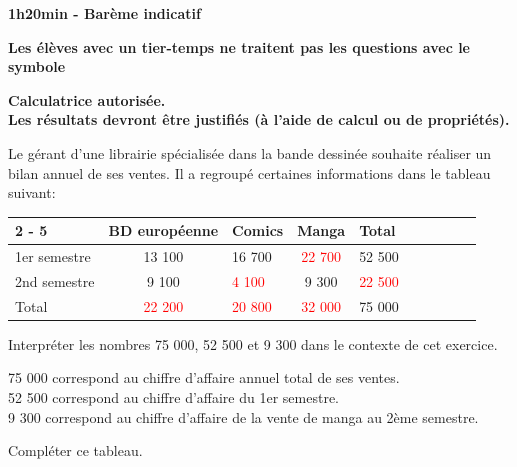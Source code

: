 \documentclass[11pt,a4paper]{article}  %
\begin{document}
	\graphicspath{{images/}}
	
	\begin{center}
		
		
	\end{center}

\begin{center}\textbf{1h20min - Barème indicatif}\end{center}
\begin{center}\textbf{Les élèves avec un tier-temps ne traitent pas les questions avec  le symbole }\end{center}
\begin{center}\textbf{Calculatrice autorisée.\\Les résultats devront être justifiés (à l'aide de calcul ou de propriétés).}\end{center}


Le gérant d'une librairie spécialisée dans la bande dessinée souhaite réaliser un bilan annuel de ses ventes. Il a regroupé certaines informations dans le tableau suivant:\\
\begin{tabular}{|Xc|Xc|Xc|Xc|Xc|}
	\cline { 2 - 5 } \multicolumn{1}{c|}{} & BD européenne & Comics & Manga & Total \\
	\hline 1er semestre & 13 100 & 16 700 & \textcolor{red}{22 700} & 52 500 \\
	\hline 2nd semestre & 9 100 & \textcolor{red}{4 100} & 9 300 &  \textcolor{red}{22 500} \\
	\hline Total & \textcolor{red}{22 200}  & \textcolor{red}{20 800}  & \textcolor{red}{32 000} & 75 000 \\
	\hline
\end{tabular}
\begin{enumMet}
	\item Interpréter les nombres 75 000, 52 500 et 9 300 dans le contexte de cet exercice.
	\begin{corrBox}
		75 000 correspond au chiffre d'affaire annuel total de ses ventes. \quad {}\\
		52 500 correspond au chiffre d'affaire du 1er semestre. \quad {}\\
		9 300 correspond au chiffre d'affaire de la vente de manga au 2ème semestre. \quad {}
	\end{corrBox}
	\item Compléter ce tableau. \quad {}
\end{enumMet}
\end{document}

